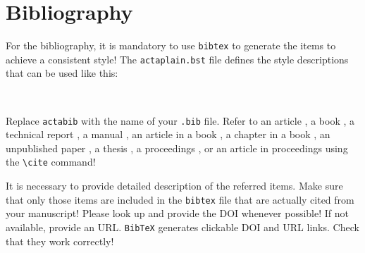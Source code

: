 \documentclass[withtitlethanks]{actacyb}
\begin{document}
\section{Bibliography}
For the bibliography, it is mandatory to use \verb|bibtex| to generate the items to achieve a consistent style!
The \verb|actaplain.bst| file defines the style descriptions that can be used like this:

\begin{verbatim}


\end{verbatim}

Replace {\tt actabib} with the name of your {\tt .bib} file.
Refer to an article \cite{ratz99nonsmooth}, a book \cite{Klatte1993a}, a technical report \cite{ratz96optimized}, a manual \cite{T3D},
an article in a book \cite{Fuchi1996a}, a chapter in a book \cite{CORR96}, an unpublished paper \cite{jamartin}, a thesis \cite{braune-diss}, a proceedings \cite{griewank-proceedings}, or an article in proceedings \cite{alefeld-survey} using the \verb|\cite| command!

It is necessary to provide detailed description of the referred items.
Make sure that only those items are included in the \verb|bibtex| file that are actually cited from your manuscript!
Please look up and provide the DOI whenever possible! If not available, provide an URL.
\verb|BibTeX| generates clickable DOI and URL links. Check that they work correctly!

{


}
\end{document}
